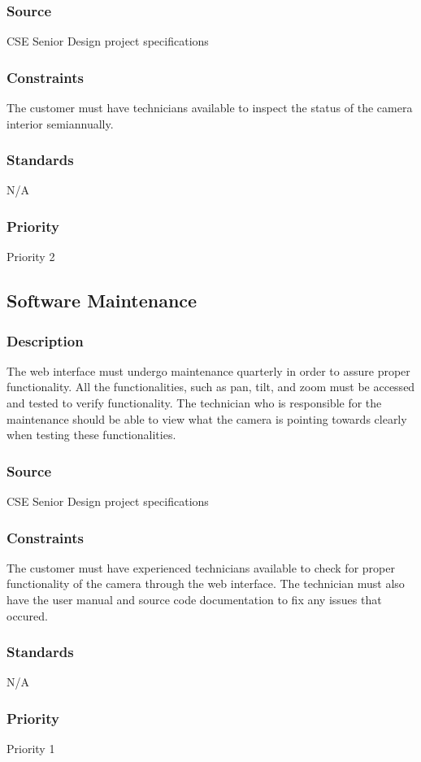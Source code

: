 \subsubsection{Source}
CSE Senior Design project specifications
\subsubsection{Constraints}
The customer must have technicians available to inspect the status of the camera interior semiannually. 
\subsubsection{Standards}
N/A
\subsubsection{Priority}
Priority 2

\subsection{Software Maintenance}
\subsubsection{Description}
The web interface must undergo maintenance quarterly in order to assure proper functionality. All the functionalities, such as pan, tilt, and zoom must be accessed and tested to verify functionality. The technician who is responsible for the maintenance should be able to view what the camera is pointing towards clearly when testing these functionalities. 
\subsubsection{Source}
CSE Senior Design project specifications
\subsubsection{Constraints}
The customer must have experienced technicians available to check for proper functionality of the camera through the web interface. The technician must also have the user manual and source code documentation to fix any issues that occured. 
\subsubsection{Standards}
N/A
\subsubsection{Priority}
Priority 1
